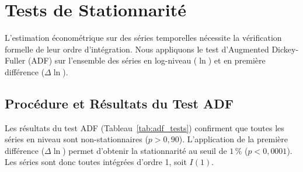 \begin{table}[htbp]
  \centering
  \caption{Comparaison des statistiques descriptives selon le capteur (DMSP vs VIIRS)}
  \label{tab:desc_sensor}
  \small
\end{table}

\section{Tests de Stationnarité}\label{sec:stationarity}

L'estimation économétrique sur des séries temporelles nécessite la vérification formelle de leur ordre d'intégration. Nous appliquons le test d'Augmented Dickey-Fuller (ADF) sur l'ensemble des séries en log-niveau ($\ln$) et en première différence ($\Delta \ln$).

\subsection{Procédure et Résultats du Test ADF}
Les résultats du test ADF (Tableau~\ref{tab:adf_tests}) confirment que toutes les séries en niveau sont non-stationnaires ($p > 0{,}90$). L'application de la première différence ($\Delta \ln$) permet d'obtenir la stationnarité au seuil de $1\,\%$ ($p < 0{,}0001$). Les séries sont donc toutes intégrées d'ordre 1, soit $I(1)$.

